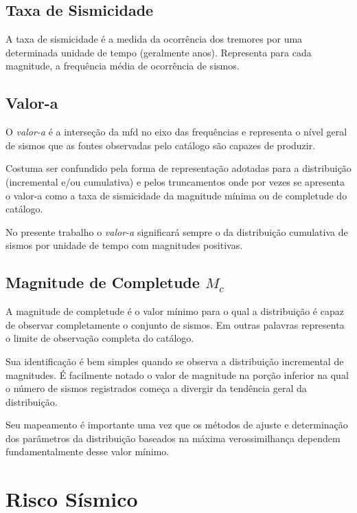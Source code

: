 \subsection{Taxa de Sismicidade}
\label{sec:seismic_rate}

A taxa de sismicidade é a medida da ocorrência dos tremores por uma determinada unidade de tempo (geralmente anos).
Representa para cada magnitude, a frequência média de ocorrência de sismos.

\subsection{Valor-a}
\label{sec:a_value}

O \emph{valor-a} é a interseção da \gls{mfd} no eixo das frequências e representa o nível geral de sismos
que as fontes observadas pelo catálogo são capazes de produzir.

Costuma ser confundido pela forma de representação adotadas para a distribuição (incremental e/ou
cumulativa) e pelos truncamentos onde por vezes se apresenta o valor-a como a taxa de sismicidade da
magnitude mínima ou de completude do catálogo.

No presente trabalho o \emph{valor-a} significará sempre o da distribuição cumulativa de sismos por unidade de
tempo com magnitudes positivas.

\subsection{Magnitude de Completude $M_c$}
\label{sec:completeness}

A magnitude de completude é o valor mínimo para o qual a distribuição é capaz de observar completamente o conjunto
de sismos. Em outras palavras representa o limite de observação completa do catálogo.

Sua identificação é bem simples quando se observa a distribuição incremental de magnitudes. É facilmente notado o valor
de magnitude na porção inferior na qual o número de sismos registrados começa a divergir da tendência geral da
distribuição.

Seu mapeamento é importante uma vez que os métodos de ajuste e determinação dos parâmetros da distribuição baseados na
máxima verossimilhança \citep{aki_1965, weichert_1980} dependem fundamentalmente desse valor mínimo.


\section{Risco Sísmico}
\label{sec:risco_sismico}

